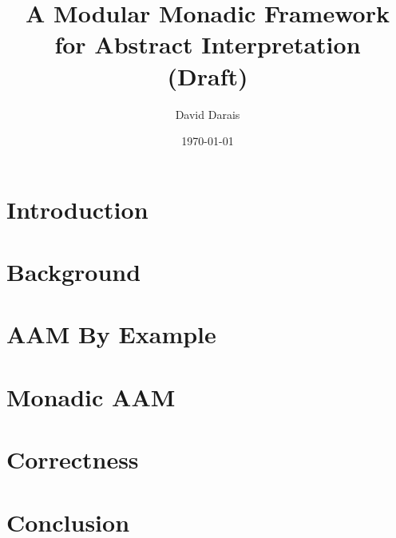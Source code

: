 \documentclass{article}
\title{A Modular Monadic Framework for Abstract Interpretation \\ (Draft)}
\author{David Darais}
\date{\today}
\begin{document}
\maketitle

\begin{abstract}

\end{abstract}

\section{Introduction}
\label{section:introduction}


\section{Background}
\label{section:background}


\section{AAM By Example}
\label{section:aam-by-example}


\section{Monadic AAM}
\label{section:monadic-aam}


\section{Correctness}
\label{section:correctness}


\section{Conclusion}
\label{section:conclusion}


{}

\end{document}
